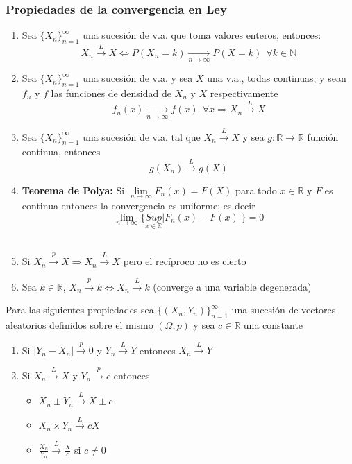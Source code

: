 		\subsubsection*{Propiedades de la convergencia en Ley}
		
			\begin{enumerate}
			\item Sea $\{X_n\}^{\infty}_{n=1}$ una sucesión de v.a. que toma valores enteros, entonces: $$X_n\xrightarrow{L}X\iff P(X_n=k)\xrightarrow[n\rightarrow\infty]{}P(X=k)\ \ \forall k\in \mathbb{N}$$
			
			\item Sea $\{X_n\}^{\infty}_{n=1}$ una sucesión de v.a. y sea $X$ una v.a., todas continuas, y sean $f_n$ y $f$ las funciones de densidad de $X_n$ y $X$ respectivamente $$f_n(x)\xrightarrow[n\rightarrow\infty]{}f(x)\ \ \forall x\Longrightarrow X_n\xrightarrow{L}X$$
			
			\item Sea $\{X_n\}^{\infty}_{n=1}$ una sucesión de v.a. tal que $X_n\xrightarrow{L}X$ y sea $g:\mathbb{R}\longrightarrow\mathbb{R}$ función continua, entonces $$g(X_n)\xrightarrow{L}g(X)$$
			
			\item \textbf{Teorema de Polya: }Si $\lim\limits_{n\rightarrow\infty}F_n(x)=F(X)$ para todo $x\in \mathbb{R}$ y $F$ es continua entonces la convergencia es uniforme; es decir $$\lim\limits_{n\rightarrow\infty}\{\underset{x\in\mathbb{R}}{Sup}|F_n(x)-F(x)|\}=0$$ 
			\\
			\item Si $X_n\xrightarrow{p}X \Longrightarrow X_n\xrightarrow{L}X$ pero el recíproco no es cierto
			
			\item Sea $k\in\mathbb{R}$,     $X_n\xrightarrow{p}k\iff X_n\xrightarrow{L}k$ (converge a una variable degenerada)
			\end{enumerate}
			
			\noindent Para las siguientes propiedades sea $\{(X_n,Y_n)\}^{\infty}_{n=1}$ una sucesión de vectores aleatorios definidos sobre el mismo $(\Omega, p)$ y sea $c\in\mathbb{R}$ una constante
			
			\begin{enumerate}
				
			\item Si $|Y_n-X_n|\xrightarrow{p}0$ y $Y_n\xrightarrow{L}Y$ entonces $X_n\xrightarrow{L}Y$ 
			
			\item Si $X_n\xrightarrow{L}X$ y $Y_n\xrightarrow{p}c$ entonces  \begin{itemize}
				\item $X_n\pm Y_n\xrightarrow{L}X\pm c$
				
				\item $X_n \times Y_n\xrightarrow{L}cX$
				
				\item $\frac{X_n}{Y_n}\xrightarrow{L}\frac{X}{c}$ si $c\neq 0$
			\end{itemize}
		\end{enumerate}
	
